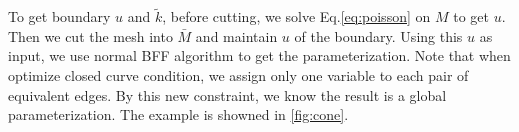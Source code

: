 \documentclass[fleqn,10pt]{wlscirep}
\begin{document}
To get boundary $u$ and $\tilde{k}$, before cutting, we solve Eq.\ref{eq:poisson} on $M$ to get $u$. Then we cut the mesh into $\bar M$ and maintain $u$ of the boundary. Using this $u$ as input, we use normal BFF algorithm to get the parameterization. Note that when optimize closed curve condition, we assign only one variable to each pair of equivalent edges. By this new constraint, we know the result is a global parameterization. The example is showned in \ref{fig:cone}.







 






\end{document}
